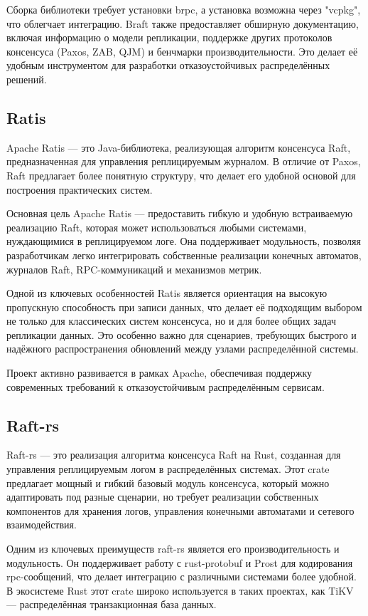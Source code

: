 Сборка библиотеки требует установки brpc, а установка возможна через "vcpkg", что
облегчает интеграцию. Braft также предоставляет обширную документацию, включая
информацию о модели репликации, поддержке других протоколов консенсуса (Paxos, ZAB, QJM)
и бенчмарки производительности. Это делает её удобным инструментом для разработки
отказоустойчивых распределённых решений.

\subsection{Ratis}

Apache Ratis \cite{ratis} — это Java-библиотека, реализующая алгоритм консенсуса Raft,
предназначенная для управления реплицируемым журналом. В отличие от Paxos, Raft
предлагает более понятную структуру, что делает его удобной основой для построения
практических систем.  

Основная цель Apache Ratis — предоставить гибкую и удобную встраиваемую реализацию Raft,
которая может использоваться любыми системами, нуждающимися в реплицируемом логе.
Она поддерживает модульность, позволяя разработчикам легко интегрировать собственные
реализации конечных автоматов, журналов Raft, RPC-коммуникаций и механизмов метрик.  

Одной из ключевых особенностей Ratis является ориентация на высокую пропускную
способность при записи данных, что делает её подходящим выбором не только для
классических систем консенсуса, но и для более общих задач репликации данных.
Это особенно важно для сценариев, требующих быстрого и надёжного распространения
обновлений между узлами распределённой системы.  

Проект активно развивается в рамках Apache, обеспечивая поддержку современных требований
к отказоустойчивым распределённым сервисам.

\subsection{Raft-rs}

Raft-rs \cite{raft_rs} — это реализация алгоритма консенсуса Raft на Rust, созданная для управления
реплицируемым логом в распределённых системах. Этот crate предлагает мощный и гибкий
базовый модуль консенсуса, который можно адаптировать под разные сценарии, но требует
реализации собственных компонентов для хранения логов, управления конечными автоматами
и сетевого взаимодействия.

Одним из ключевых преимуществ raft-rs является его производительность и модульность.
Он поддерживает работу с rust-protobuf и Prost для кодирования rpc-сообщений, что
делает интеграцию с различными системами более удобной. В экосистеме Rust этот crate
широко используется в таких проектах, как TiKV — распределённая транзакционная база
данных.

